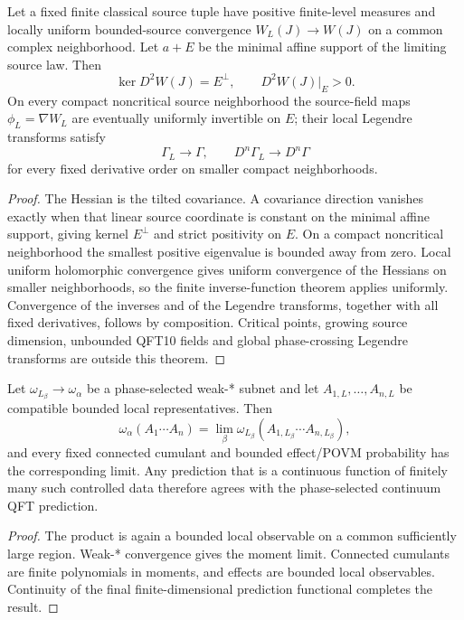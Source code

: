 \documentclass[12pt,a4paper]{article}
\begin{document}
\begin{theorem}
\label{p12:thm:v283-local-1pi-transfer}
Let a fixed finite classical source tuple have positive finite-level measures and locally uniform bounded-source convergence \(W_L(J)\to W(J)\) on a common complex neighborhood.  Let \(a+E\) be the minimal affine support of the limiting source law.  Then
\[
 \ker D^2W(J)=E^\perp,\qquad D^2W(J)|_E>0.
\]
On every compact noncritical source neighborhood the source-field maps \(\phi_L=\nabla W_L\) are eventually uniformly invertible on \(E\); their local Legendre transforms satisfy
\[
 \Gamma_L\to\Gamma,\qquad D^n\Gamma_L\to D^n\Gamma
\]
for every fixed derivative order on smaller compact neighborhoods.
\end{theorem}
\begin{proof}
The Hessian is the tilted covariance.  A covariance direction vanishes exactly when that linear source coordinate is constant on the minimal affine support, giving kernel \(E^\perp\) and strict positivity on \(E\).  On a compact noncritical neighborhood the smallest positive eigenvalue is bounded away from zero.  Local uniform holomorphic convergence gives uniform convergence of the Hessians on smaller neighborhoods, so the finite inverse-function theorem applies uniformly.  Convergence of the inverses and of the Legendre transforms, together with all fixed derivatives, follows by composition.  Critical points, growing source dimension, unbounded QFT10 fields and global phase-crossing Legendre transforms are outside this theorem.
\end{proof}

\begin{theorem}
\label{p12:thm:v283-phase-prediction-transfer}
Let \(\omega_{L_\beta}\to\omega_\alpha\) be a phase-selected weak-* subnet and let \(A_{1,L},\ldots,A_{n,L}\) be compatible bounded local representatives.  Then
\[
 \omega_\alpha(A_1\cdots A_n)
 =\lim_\beta\omega_{L_\beta}(A_{1,L_\beta}\cdots A_{n,L_\beta}),
\]
and every fixed connected cumulant and bounded effect/POVM probability has the corresponding limit.  Any prediction that is a continuous function of finitely many such controlled data therefore agrees with the phase-selected continuum QFT prediction.
\end{theorem}
\begin{proof}
The product is again a bounded local observable on a common sufficiently large region.  Weak-* convergence gives the moment limit.  Connected cumulants are finite polynomials in moments, and effects are bounded local observables.  Continuity of the final finite-dimensional prediction functional completes the result.
\end{proof}
\end{document}
